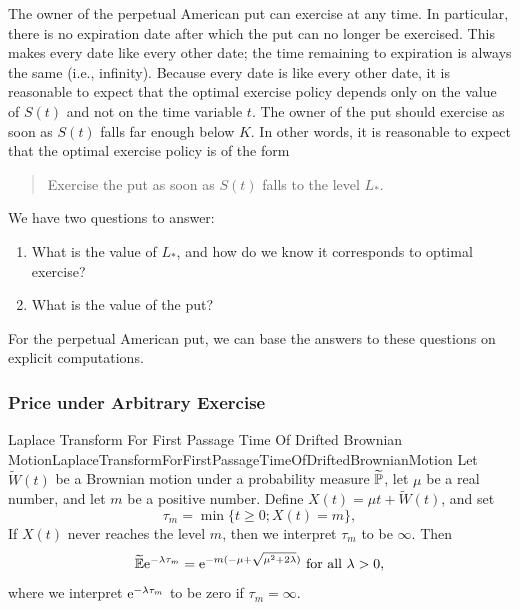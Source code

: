 The owner of the perpetual American put can exercise at any time. In particular, there is no expiration date after which the put can no longer be exercised. This makes every date like every other date; the time remaining to expiration is always the same (i.e., infinity). Because every date is like every other date, it is reasonable to expect that the optimal exercise policy depends only on the value of \(S(t)\) and not on the time variable \(t\). The owner of the put should exercise as soon as \(S(t)\) falls far enough below \(K\). In other words, it is reasonable to expect that the optimal exercise policy is of the form
\begin{quote} Exercise the put as soon as \(S(t)\) falls to the level \(L_*\).
\end{quote}

We have two questions to answer:
\begin{enumerate}[label=\textup{(\roman*)}]
\item What is the value of \(L_*\), and how do we know it corresponds to optimal exercise?
	\item What is the value of the put?
\end{enumerate}

For the perpetual American put, we can base the answers to these questions on explicit computations.

\subsubsection{Price under Arbitrary Exercise}

\begin{thm}{Laplace Transform For First Passage Time Of Drifted Brownian Motion}{LaplaceTransformForFirstPassageTimeOfDriftedBrownianMotion}
	Let \(\widetilde{W}(t)\) be a Brownian motion under a probability measure \(\widetilde{\mathbb{P}}\), let \(\mu\) be a real number, and let \(m\) be a positive number. Define \(X(t) = \mu t + \widetilde{W}(t)\), and set
	\[
		\tau_m = \min\{t \ge 0 ; X(t) = m\},
	\]
	If \(X(t)\) never reaches the level \(m\), then we interpret \(\tau_m\) to be \(\infty\). Then
	\begin{equation} \label{eq:LaplaceTransformFormula}
		\widetilde{\mathbb{E}}\mathrm{e}^{-\lambda \tau_m} = \mathrm{e}^{-m(-\mu+\sqrt{\mu^2+2\lambda})} \text{ for all } \lambda > 0,
	\end{equation}
	where we interpret \(\mathrm{e}^{-\lambda \tau_m}\) to be zero if \(\tau_m = \infty\).
\end{thm}

